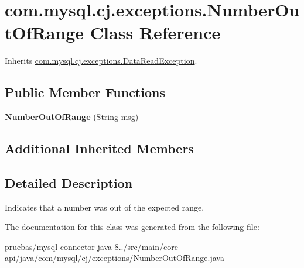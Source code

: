 \hypertarget{classcom_1_1mysql_1_1cj_1_1exceptions_1_1_number_out_of_range}{}\section{com.\+mysql.\+cj.\+exceptions.\+Number\+Out\+Of\+Range Class Reference}
\label{classcom_1_1mysql_1_1cj_1_1exceptions_1_1_number_out_of_range}


Inherits \mbox{\hyperlink{classcom_1_1mysql_1_1cj_1_1exceptions_1_1_data_read_exception}{com.\+mysql.\+cj.\+exceptions.\+Data\+Read\+Exception}}.

\subsection*{Public Member Functions}
\begin{DoxyCompactItemize}
\item 
\mbox{\label{classcom_1_1mysql_1_1cj_1_1exceptions_1_1_number_out_of_range_ab96e11fba1a6337ec6b56e9f4a552f1b}} 
{\bfseries Number\+Out\+Of\+Range} (String msg)
\end{DoxyCompactItemize}
\subsection*{Additional Inherited Members}


\subsection{Detailed Description}
Indicates that a number was out of the expected range. 

The documentation for this class was generated from the following file\+:\begin{DoxyCompactItemize}
\item 
pruebas/mysql-\/connector-\/java-\/8../src/main/core-\/api/java/com/mysql/cj/exceptions/Number\+Out\+Of\+Range.\+java\end{DoxyCompactItemize}
